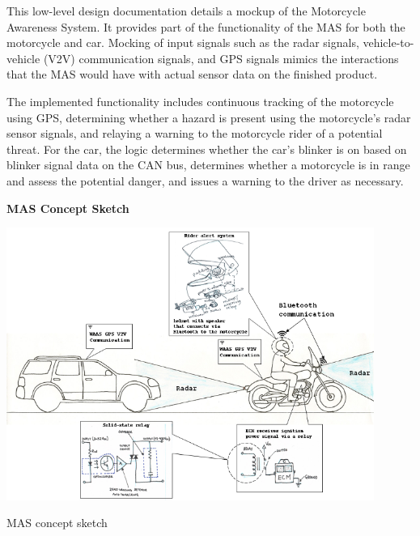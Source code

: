 This low-\/level design documentation details a mockup of the Motorcycle Awareness System. It provides part of the functionality of the M\-A\-S for both the motorcycle and car. Mocking of input signals such as the radar signals, vehicle-\/to-\/vehicle (V2\-V) communication signals, and G\-P\-S signals mimics the interactions that the M\-A\-S would have with actual sensor data on the finished product.

The implemented functionality includes continuous tracking of the motorcycle using G\-P\-S, determining whether a hazard is present using the motorcycle's radar sensor signals, and relaying a warning to the motorcycle rider of a potential threat. For the car, the logic determines whether the car's blinker is on based on blinker signal data on the C\-A\-N bus, determines whether a motorcycle is in range and assess the potential danger, and issues a warning to the driver as necessary.

{\bfseries M\-A\-S Concept Sketch}  
\begin{DoxyImage}
\includegraphics[width=12cm]{MAS_system_overview}
\caption{M\-A\-S concept sketch}
\end{DoxyImage}
 